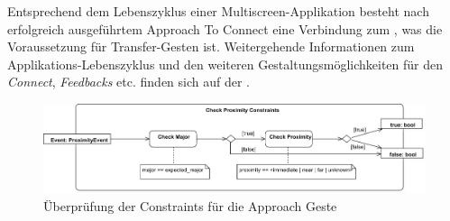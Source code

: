 {Entsprechend dem Lebenszyklus einer Multiscreen-Applikation besteht nach erfolgreich
ausgeführtem Approach To Connect eine Verbindung zum \recdev{}, was die Voraussetzung für Transfer-Gesten ist.
Weitergehende Informationen zum Applikations-Lebenszyklus und den weiteren
Gestaltungsmöglichkeiten für den \textit{Connect}, \textit{Feedbacks} etc. finden sich
auf der \developerpage.

\begin{figure}[h]
\includegraphics[width=\textwidth]{approach_check_constraints.png}
\caption{Überprüfung der Constraints für die Approach Geste}
\label{check_approach_constraints}
\end{figure}
}


\newcommand{\authors}{Horst Schneider, Hochschule Mannheim\\
Dominick Madden, Hochschule Mannheim\\
Valentina Burjan, Hochschule Mannheim}
\newcommand{\versionhistory}{20.02.2017}
\newcommand{\dateofcreation}{15.08.2015}
\newcommand{\comments}{...}
\newcommand{\questions}{...}





